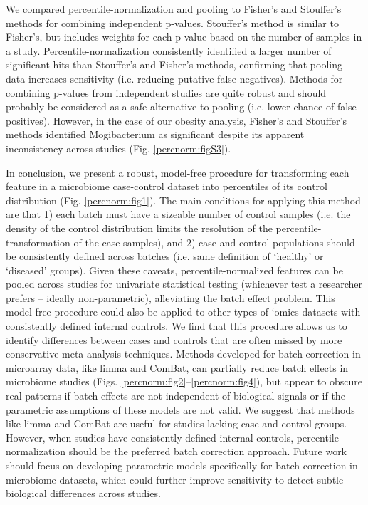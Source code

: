 We compared percentile-normalization and pooling to Fisher's and Stouffer's methods for combining independent p-values.
Stouffer's method is similar to Fisher's, but includes weights for each p-value based on the number of samples in a study.
Percentile-normalization consistently identified a larger number of significant hits than Stouffer's and Fisher's methods, confirming that pooling data increases sensitivity (i.e. reducing putative false negatives).
Methods for combining p-values from independent studies are quite robust and should probably be considered as a safe alternative to pooling (i.e. lower chance of false positives).
However, in the case of our obesity analysis, Fisher's and Stouffer's methods identified Mogibacterium as significant despite its apparent inconsistency across studies (Fig. \ref{percnorm:figS3}).

In conclusion, we present a robust, model-free procedure for transforming each feature in a microbiome case-control dataset into percentiles of its control distribution (Fig. \ref{percnorm:fig1}).
The main conditions for applying this method are that 1) each batch must have a sizeable number of control samples (i.e. the density of the control distribution limits the resolution of the percentile-transformation of the case samples), and 2) case and control populations should be consistently defined across batches (i.e. same definition of `healthy' or `diseased' groups).
Given these caveats, percentile-normalized features can be pooled across studies for univariate statistical testing (whichever test a researcher prefers -- ideally non-parametric), alleviating the batch effect problem.
This model-free procedure could also be applied to other types of `omics datasets with consistently defined internal controls.
We find that this procedure allows us to identify differences between cases and controls that are often missed by more conservative meta-analysis techniques.
Methods developed for batch-correction in microarray data, like limma and ComBat, can partially reduce batch effects in microbiome studies (Figs. \ref{percnorm:fig2}--\ref{percnorm:fig4}), but appear to obscure real patterns if batch effects are not independent of biological signals or if the parametric assumptions of these models are not valid.
We suggest that methods like limma and ComBat are useful for studies lacking case and control groups.
However, when studies have consistently defined internal controls, percentile-normalization should be the preferred batch correction approach.
Future work should focus on developing parametric models specifically for batch correction in microbiome datasets, which could further improve sensitivity to detect subtle biological differences across studies.

